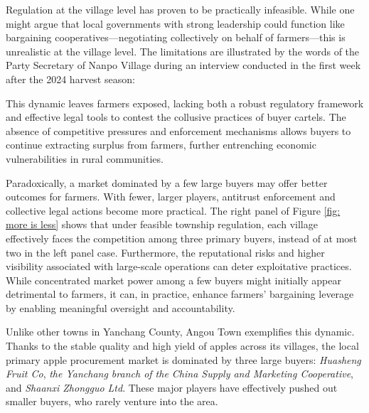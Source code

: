 Regulation at the village level has proven to be practically infeasible. While one might argue that local governments with strong leadership could function like bargaining cooperatives—negotiating collectively on behalf of farmers—this is unrealistic at the village level. The limitations are illustrated by the words of the Party Secretary of Nanpo Village during an interview conducted in the first week after the 2024 harvest season:

\begin{quote}  \end{quote}

This dynamic leaves farmers exposed, lacking both a robust regulatory framework and effective legal tools to contest the collusive practices of buyer cartels. The absence of competitive pressures and enforcement mechanisms allows buyers to continue extracting surplus from farmers, further entrenching economic vulnerabilities in rural communities.


Paradoxically, a market dominated by a few large buyers may offer better outcomes for farmers. With fewer, larger players, antitrust enforcement and collective legal actions become more practical. The right panel of Figure \ref{fig: more is less} shows that under feasible township regulation, each village effectively faces the competition among three primary buyers, instead of at most two in the left panel case. Furthermore, the reputational risks and higher visibility associated with large-scale operations can deter exploitative practices. While concentrated market power among a few buyers might initially appear detrimental to farmers, it can, in practice, enhance farmers’ bargaining leverage by enabling meaningful oversight and accountability.

Unlike other towns in Yanchang County, Angou Town exemplifies this dynamic. Thanks to the stable quality and high yield of apples across its villages, the local primary apple procurement market is dominated by three large buyers: \textit{Huasheng Fruit Co}, \textit{the Yanchang branch of the China Supply and Marketing Cooperative}, and \textit{Shaanxi Zhongguo Ltd}. These major players have effectively pushed out smaller buyers, who rarely venture into the area.

